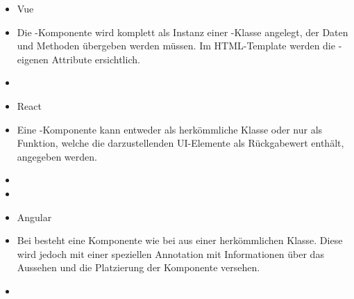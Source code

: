 \begin{itemize}
    \captionsetup{justification=centering}
    \item{Vue}
    \item[] Die -Komponente wird komplett als Instanz einer -Klasse angelegt, der Daten und Methoden übergeben werden müssen. Im HTML-Template werden die -eigenen Attribute ersichtlich.
    \item[] 
    \item{React}
    \item[] Eine -Komponente kann entweder als herkömmliche Klasse oder nur als Funktion, welche die darzustellenden UI-Elemente als Rückgabewert enthält, angegeben werden.
    \item[] 
    \item[] 
    \item{Angular}
    \item[] Bei  besteht eine Komponente wie bei  aus einer herkömmlichen Klasse. Diese wird jedoch mit einer speziellen Annotation mit Informationen über das Aussehen und die Platzierung der Komponente versehen.
    \item[] 
\end{itemize}

